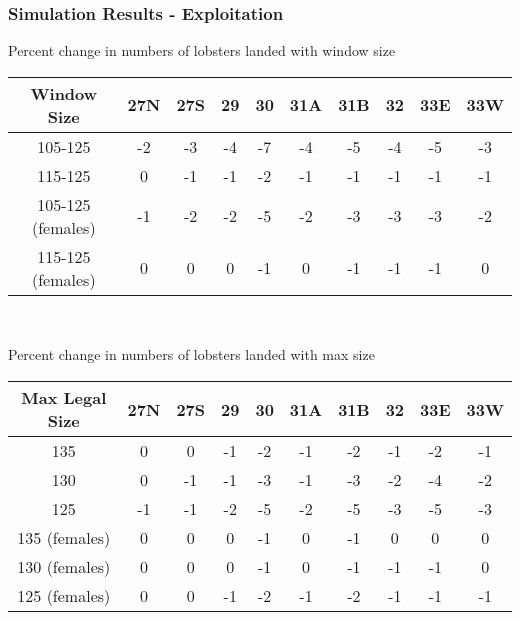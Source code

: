 \documentclass{beamer}
\begin{document}
\begin{frame}
\frametitle{Simulation Results - Exploitation}
Percent change in numbers of lobsters landed with window size 
\centering
\begin{tabular}{|c|c|c|c|c|c|c|c|c|c|}
\hline
Window Size       & 27N & 27S & 29 & 30 & 31A & 31B & 32 & 33E & 33W \\
\hline
105-125           & -2 & -3 & -4 & -7 & -4 & -5 & -4 & -5 & -3 \\
\hline
115-125           & 0 & -1 & -1 & -2 & -1 & -1 & -1 & -1 & -1 \\
\hline
105-125 (females) & -1 & -2 & -2 & -5 & -2 & -3 & -3 & -3 & -2 \\
\hline
115-125 (females)  & 0 & 0 & 0 & -1 & 0 & -1 & -1 & -1 & 0 \\
\hline
 
\end{tabular}\\
\vspace{5mm}

Percent change in numbers of lobsters landed with max size 
\centering
\begin{tabular}{|c|c|c|c|c|c|c|c|c|c|}
\hline
Max Legal Size & 27N & 27S & 29 & 30 & 31A & 31B & 32 & 33E & 33W \\
\hline
135            & 0 & 0 & -1 & -2 & -1 & -2 & -1 & -2 & -1 \\
\hline
130            & 0 & -1 & -1 & -3 & -1 & -3 & -2 & -4 & -2 \\
\hline
125            & -1 & -1 & -2 & -5 & -2 & -5 & -3 & -5 & -3 \\
\hline
135 (females)   & 0 & 0 & 0 & -1 & 0 & -1 & 0 & 0 & 0 \\
\hline
130 (females)   & 0 & 0 & 0 & -1 & 0 & -1 & -1 & -1 & 0 \\
\hline
125 (females)   & 0 & 0 & -1 & -2 & -1 & -2 & -1 & -1 & -1 \\
\hline
 
 
\end{tabular}
\end{frame}
\end{document}
